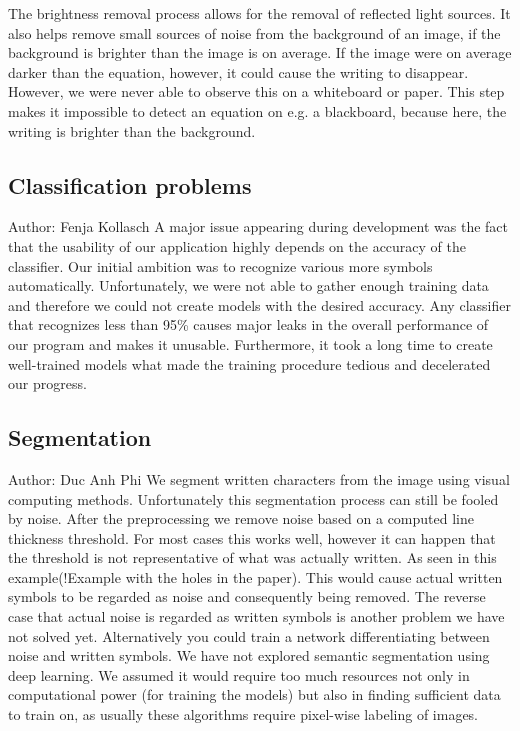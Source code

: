 \documentclass[11pt]{article}
\begin{document}
	The brightness removal process allows for the removal of reflected light sources.
	It also helps remove small sources of noise from the background of an image, if the background is brighter than the image is on average.
	If the image were on average darker than the equation, however, it could cause the writing to disappear.
	However, we were never able to observe this on a whiteboard or paper.
	This step makes it impossible to detect an equation on e.g. a blackboard, because here, the writing is brighter than the background.
	
	\subsection{Classification problems}
	\small{Author: Fenja Kollasch} \newline \newline
	A major issue appearing during development was the fact that the usability of our application highly depends on the accuracy of the classifier. Our initial ambition was to recognize various more symbols automatically. Unfortunately, we were not able to gather enough training data and therefore we could not create models with the desired accuracy. Any classifier that recognizes less than 95\% causes major leaks in the overall performance of our program and makes it unusable. Furthermore, it took a long time to create well-trained models what made the training procedure tedious and decelerated our progress.

		
	\subsection{Segmentation}
	\small{Author: Duc Anh Phi} \newline \newline
	We segment written characters from the image using visual computing methods. Unfortunately this segmentation process can still be fooled by noise. After the preprocessing we remove noise based on a computed line thickness threshold. For most cases this works well, however it can happen that the threshold is not representative of what was actually written. As seen in this example(!Example with the holes in the paper). This would cause actual written symbols to be regarded as noise and consequently being removed. The reverse case that actual noise is regarded as written symbols is another problem we have not solved yet. Alternatively you could train a network differentiating between noise and written symbols. We have not explored semantic segmentation using deep learning. We assumed it would require too much resources not only in computational power (for training the models) but also in finding sufficient data to train on, as usually these algorithms require pixel-wise labeling of images.
\end{document}
